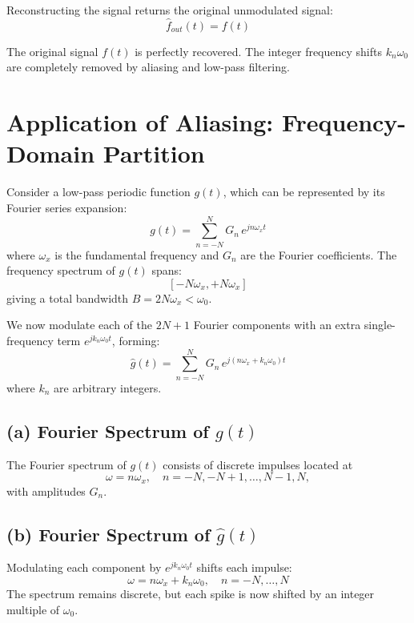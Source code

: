 \documentclass{article}
\begin{document}
Reconstructing the signal returns the original unmodulated signal:
\[
\hat{f}_{out}(t) = f(t)
\]

The original signal \(f(t)\) is perfectly recovered. The integer frequency shifts \(k_n \omega_0\) are completely removed by aliasing and low-pass filtering.


\section{Application of Aliasing: Frequency-Domain Partition}

Consider a low-pass periodic function \(g(t)\), which can be represented by its Fourier series expansion:
\[
g(t) = \sum_{n=-N}^{N} G_n \, e^{j n \omega_x t}
\]
where \(\omega_x\) is the fundamental frequency and \(G_n\) are the Fourier coefficients.  
The frequency spectrum of \(g(t)\) spans:
\[
[-N \omega_x, +N \omega_x]
\]
giving a total bandwidth \(B = 2N \omega_x < \omega_0\).

We now modulate each of the \(2N+1\) Fourier components with an extra single-frequency term \(e^{j k_n \omega_0 t}\), forming:
\[
\hat{g}(t)  
= \sum_{n=-N}^{N} G_n \, e^{j (n \omega_x + k_n \omega_0) t}
\]
where \(k_n\) are arbitrary integers.

\subsection*{(a) Fourier Spectrum of \(g(t)\)}
The Fourier spectrum of \(g(t)\) consists of discrete impulses located at
\[
\omega = n \omega_x, \quad n = -N, -N+1, \dots, N-1, N,
\]
with amplitudes \(G_n\).

\begin{figure}[h!]
\centering
{}
\end{figure}

\subsection*{(b) Fourier Spectrum of \(\hat{g}(t)\)}
Modulating each component by \(e^{j k_n \omega_0 t}\) shifts each impulse:
\[
\omega = n \omega_x + k_n \omega_0, \quad n = -N, \dots, N
\]
The spectrum remains discrete, but each spike is now shifted by an integer multiple of \(\omega_0\).  
\end{document}
